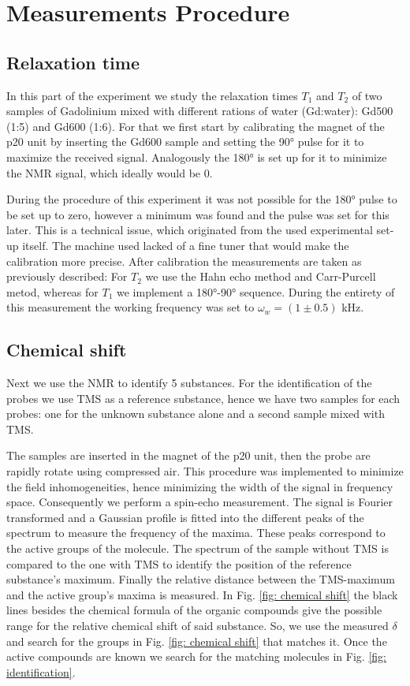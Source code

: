 \section{Measurements Procedure}
\subsection{Relaxation time}
In this part of the experiment we study the relaxation times $T_1$ and $T_2$ of two samples of Gadolinium mixed with different rations of water (Gd:water): Gd500 (1:5) and Gd600 (1:6). For that we first start by calibrating the magnet of the p20 unit by inserting the Gd600 sample and setting the 90° pulse for it to maximize the received signal. Analogously the 180° is set up for it to minimize the NMR signal, which ideally would be 0. 

During the procedure of this experiment it was not possible for the 180° pulse to be set up to zero, however a minimum was found and the pulse was set for this later. This is a technical issue, which originated from the used experimental set-up itself. The machine used lacked of a fine tuner that would make the calibration more precise. 
After calibration the measurements are taken as previously described: For $T_2$ we use the Hahn echo method and Carr-Purcell metod, whereas for $T_1$ we implement a 180°-90° sequence. 
During the entirety of this measurement the working frequency was set to $\omega_w = (1 \pm 0.5)$ kHz.
\subsection{Chemical shift}
\label{sec: chemical shift}

Next we use the NMR to identify 5 substances. For the identification of the probes we use TMS as a reference substance, hence we have two samples for each probes: one for the unknown substance alone and a second sample mixed with TMS.

The samples are inserted in the magnet of the p20 unit, then the probe are rapidly rotate using compressed air. This procedure was implemented to minimize the field inhomogeneities, hence minimizing the width of the signal in frequency space. Consequently we perform a spin-echo measurement. The signal is Fourier transformed and a Gaussian profile is fitted into the different peaks of the spectrum to measure the frequency of the maxima. These peaks correspond to the active groups of the molecule.
The spectrum of the sample without TMS is compared to the one with TMS to identify the position of the reference substance's maximum. Finally the relative distance between the TMS-maximum and the active group's maxima is measured. In Fig. \ref{fig: chemical shift} the black lines besides the chemical formula of the organic compounds give the possible range for the relative chemical shift of said substance. So, we use the measured $\delta$  and search for the groups in Fig. \ref{fig: chemical shift} that matches it. Once the active compounds are known we search for the matching molecules in Fig. \ref{fig: identification}.

